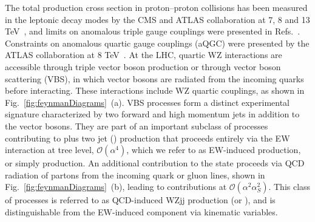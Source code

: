 The total \WZ production cross section in proton--proton collisions 
has been measured in the leptonic decay modes by the CMS and ATLAS collaboration at 
7, 8 and 13 TeV~\cite{Aad:2012twa,Aad:2016ett,Khachatryan:2016tgp,Khachatryan:2016poo}, 
and limits on anomalous triple gauge couplings were presented in Refs.~\cite{Aad:2016ett,Khachatryan:2016poo}. 
Constraints on anomalous quartic gauge couplings (aQGC) were presented by the ATLAS collaboration at 8 TeV~\cite{Aad:2016ett}. 
At the LHC, quartic WZ interactions are accessible through triple vector boson production or through vector boson scattering (VBS), 
in which vector bosons are radiated from the incoming quarks before interacting.
These interactions include WZ quartic couplings, as shown in Fig.~\ref{fig:feynmanDiagrams}~(a). 
VBS processes form a distinct experimental signature characterized by two forward and high momentum jets in addition 
to the vector bosons. They are part of an important subclass of processes contributing to 
\WZ plus two jet (\WZjj) production that proceeds entirely via the EW interaction at tree level,
$\mathcal{O}(\alpha^4)$, which we refer to as EW-induced \WZjj production, or simply \EWWZ production. 
An additional contribution to the \WZjj state proceeds via QCD radiation of partons from 
the incoming quark or gluon lines, shown in Fig.~\ref{fig:feynmanDiagrams}~(b), 
leading to contributions at $\mathcal{O}(\alpha^2\alpha_{S}^2)$.
This class of processes is referred to as QCD-induced WZjj production (or \QCDWZ),
and is distinguishable from the EW-induced component via kinematic variables.


